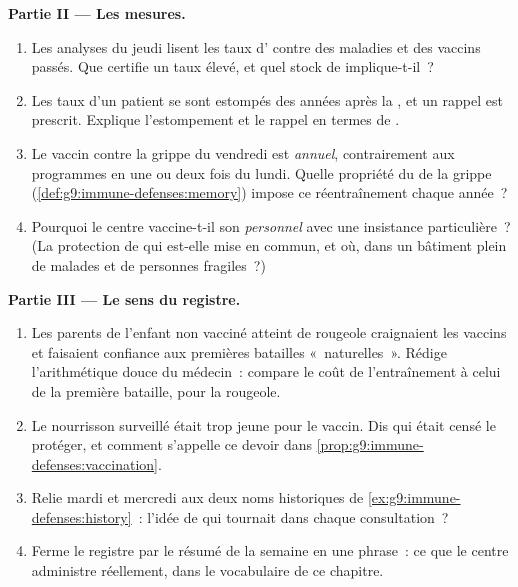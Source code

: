 \begin{problem}
\medskip\noindent\textbf{Partie II --- Les mesures.}
\begin{enumerate}[resume]
  \item Les analyses du jeudi lisent les taux d'
        contre des maladies et des vaccins passés. Que
        certifie un taux élevé, et quel stock de 
        implique-t-il~?
  \item Les taux d'un patient se sont estompés des années
        après la , et un rappel est prescrit.
        Explique l'estompement et le rappel en termes de
        .
  \item Le vaccin contre la grippe du vendredi est
        \emph{annuel}, contrairement aux programmes en une
        ou deux fois du lundi. Quelle propriété du  de
        la grippe (\cref{def:g9:immune-defenses:memory})
        impose ce réentraînement chaque année~?
  \item Pourquoi le centre vaccine-t-il son \emph{personnel}
        avec une insistance particulière~? (La protection de
        qui est-elle mise en commun, et où, dans un bâtiment
        plein de malades et de personnes fragiles~?)
\end{enumerate}

\medskip\noindent\textbf{Partie III --- Le sens du
registre.}
\begin{enumerate}[resume]
  \item Les parents de l'enfant non vacciné atteint de
        rougeole craignaient les vaccins et faisaient
        confiance aux premières batailles «~naturelles~».
        Rédige l'arithmétique douce du médecin~: compare le
        coût de l'entraînement à celui de la première
        bataille, pour la rougeole.
  \item Le nourrisson surveillé était trop jeune pour le
        vaccin. Dis qui était censé le protéger, et comment
        s'appelle ce devoir dans
        \cref{prop:g9:immune-defenses:vaccination}.
  \item Relie mardi et mercredi aux deux noms historiques de
        \cref{ex:g9:immune-defenses:history}~: l'idée de qui
        tournait dans chaque consultation~?
  \item Ferme le registre par le résumé de la semaine en une
        phrase~: ce que le centre administre réellement, dans
        le vocabulaire de ce chapitre.
\end{enumerate}
\end{problem}
